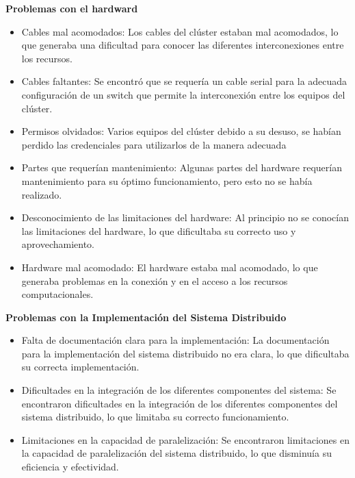 \begin{spacing}{1.5}
  \textbf{Problemas con el hardward}

  \begin{itemize}
    \item Cables mal acomodados: Los cables del clúster estaban mal
          acomodados, lo que generaba una dificultad para conocer las
          diferentes
          interconexiones entre los recursos.
    \item Cables faltantes: Se encontró que se requería un cable serial
          para la adecuada configuración de un switch que permite la
          interconexión entre
          los equipos del clúster.
    \item Permisos olvidados: Varios equipos del clúster debido a su
          desuso, se habían perdido las credenciales para utilizarlos de la
          manera
          adecuada
    \item Partes que requerían mantenimiento: Algunas partes del hardware
          requerían mantenimiento para su óptimo funcionamiento, pero esto no
          se había
          realizado.
    \item Desconocimiento de las limitaciones del hardware: Al principio no
          se conocían las limitaciones del hardware, lo que dificultaba su
          correcto uso y
          aprovechamiento.
    \item Hardware mal acomodado: El hardware estaba mal acomodado, lo que
          generaba problemas en la conexión y en el acceso a los recursos
          computacionales.
  \end{itemize}

  \textbf{Problemas con la Implementación del Sistema Distribuido}

  \begin{itemize}
    \item Falta de documentación clara para la implementación: La
          documentación para la implementación del sistema distribuido no era
          clara, lo
          que dificultaba su correcta implementación.
    \item Dificultades en la integración de los diferentes componentes del
          sistema: Se encontraron dificultades en la integración de los
          diferentes
          componentes del sistema distribuido, lo que limitaba su correcto
          funcionamiento.
    \item Limitaciones en la capacidad de paralelización: Se encontraron
          limitaciones en la capacidad de paralelización del sistema
          distribuido, lo que
          disminuía su eficiencia y efectividad.
  \end{itemize}


\end{spacing}

